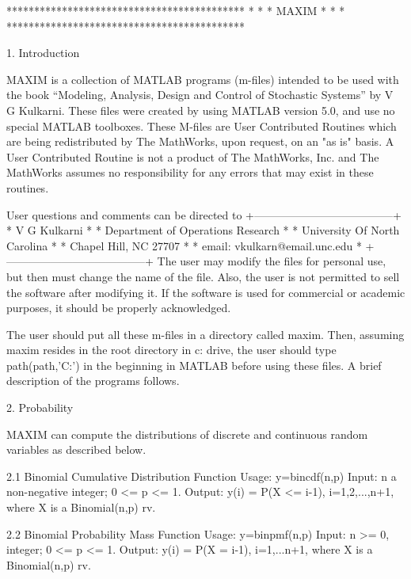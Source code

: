 *******************************************
*                                         * 
*                  MAXIM                  *
*                                         *  
*******************************************


       
1. Introduction



MAXIM is a collection of MATLAB programs (m-files) intended to be used with the book ``Modeling, Analysis, Design and Control of Stochastic Systems'' by V G Kulkarni. These files were created by using MATLAB version 5.0, and use no special MATLAB toolboxes. These M-files are User Contributed Routines which are being redistributed by The MathWorks, upon request, on an "as is" basis. A User Contributed Routine is not a product of The MathWorks, Inc. and The MathWorks assumes no responsibility for any errors that may exist in these routines. 

User questions and comments can be directed to 
         +--------------------------------------+
         *   V G Kulkarni                       *
         *   Department of Operations Research  *
         *   University Of North Carolina       *
         *   Chapel Hill, NC 27707              *
         *   email: vkulkarn@email.unc.edu      *
         +--------------------------------------+
The user may modify the files for personal use, but then must change the name of the file. Also, the user is not permitted to sell the software after modifying it. If the software is used for commercial or academic purposes, it should be properly acknowledged. 

The user should put all these m-files in a directory called maxim. Then, assuming maxim resides in the root directory in c: drive, the user should type 
path(path,'C:\maxim')
in the beginning in MATLAB before using these files. A brief description of the programs follows.



2. Probability



MAXIM can compute the distributions of discrete and continuous random variables as described below.

2.1 Binomial Cumulative Distribution Function
Usage: y=bincdf(n,p)
Input: n a non-negative integer;  0 <= p <= 1.
Output: y(i) = P(X <= i-1), i=1,2,...,n+1, where X is a  Binomial(n,p) rv.

2.2 Binomial Probability Mass Function
Usage:  y=binpmf(n,p)
Input: n >= 0, integer; 0 <= p <= 1.
Output: y(i) = P(X = i-1),  i=1,...n+1, where X  is a  Binomial(n,p) rv.

